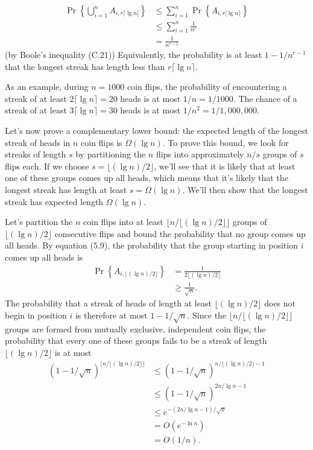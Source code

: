 \documentclass[lang=cn,newtx,10pt,scheme=chinese]{elegantbook}
\begin{document}
$$
\begin{aligned}
\operatorname{Pr}\left\{\bigcup_{i=1}^n A_{i, r\lceil\lg n]}\right\} & \leq \sum_{i=1}^n \operatorname{Pr}\left\{A_{i, r[\lg n\rceil}\right\} \\
& \leq \sum_{i=1}^n \frac{1}{n^r} \\
& =\frac{1}{n^{r-1}}
\end{aligned}
$$
(by Boole's inequality (C.21))
Equivalently, the probability is at least $1-1 / n^{r-1}$ that the longest streak has length less than $r\lceil\lg n\rceil$.

As an example, during $n=1000$ coin flips, the probability of encountering a streak of at least $2\lceil\lg n\rceil=20$ heads is at most $1 / n=1 / 1000$. The chance of a streak of at least $3\lceil\lg n\rceil=30$ heads is at most $1 / n^2=1 / 1,000,000$.

Let's now prove a complementary lower bound: the expected length of the longest streak of heads in $n$ coin flips is $\Omega(\lg n)$. To prove this bound, we look for streaks of length $s$ by partitioning the $n$ flips into approximately $n / s$ groups of $s$ flips each. If we choose $s=\lfloor(\lg n) / 2\rfloor$, we'll see that it is likely that at least one of these groups comes up all heads, which means that it's likely that the longest streak has length at least $s=\Omega(\lg n)$. We'll then show that the longest streak has expected length $\Omega(\lg n)$.

Let's partition the $n$ coin flips into at least $\lfloor n /\lfloor(\lg n) / 2\rfloor\rfloor$ groups of $\lfloor(\lg n) / 2\rfloor$ consecutive flips and bound the probability that no group comes up all heads. By equation (5.9), the probability that the group starting in position $i$ comes up all heads is
$$
\begin{aligned}
\operatorname{Pr}\left\{A_{i,\lfloor(\lg n) / 2\rfloor}\right\} & =\frac{1}{2\lfloor(\lg n) / 2\rfloor} \\
& \geq \frac{1}{\sqrt{n}} .
\end{aligned}
$$
The probability that a streak of heads of length at least $\lfloor(\lg n) / 2\rfloor$ does not begin in position $i$ is therefore at most $1-1 / \sqrt{n}$. Since the $\lfloor n /\lfloor(\lg n) / 2\rfloor\rfloor$ groups are formed from mutually exclusive, independent coin flips, the probability that every one of these groups fails to be a streak of length $\lfloor(\lg n) / 2\rfloor$ is at most
$$
\begin{aligned}
(1-1 / \sqrt{n})^{\lfloor n /\lfloor(\lg n) / 2\rfloor\rfloor} & \leq(1-1 / \sqrt{n})^{n /\lfloor(\lg n) / 2\rfloor-1} \\
& \leq(1-1 / \sqrt{n})^{2 n / \lg n-1} \\
& \leq e^{-(2 n / \lg n-1) / \sqrt{n}} \\
& =O\left(e^{-\ln n}\right) \\
& =O(1 / n) .
\end{aligned}
$$
\end{document}
